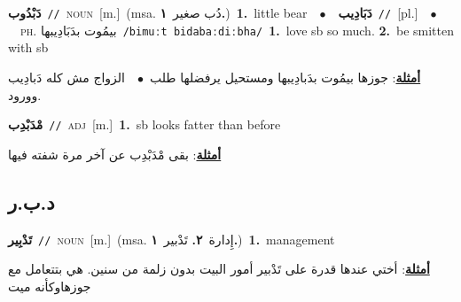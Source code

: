 \documentclass[10pt,a4paper,twoside]{article} %
\begin{document}
\begin{multicols}{2}
{{\setlength\topsep{0pt}\textbf{\foreignlanguage{arabic}{دَبْدُوب}}\ {\color{gray}\texttt{//}\color{black}}\ \textsc{noun}\ [m.]\ \color{gray}(msa. \foreignlanguage{arabic}{دُب صغير}~\foreignlanguage{arabic}{\textbf{١.}})\color{black}\ \textbf{1.}~little bear\ \ $\bullet$\ \ \setlength\topsep{0pt}\textbf{\foreignlanguage{arabic}{دَبَادِيب}}\ {\color{gray}\texttt{//}\color{black}}\ [pl.]\ \ $\bullet$\ \ \textsc{ph.} \color{gray} \foreignlanguage{arabic}{بيمُوت بدَبَادِيبها}\color{black}\ {\color{gray}\texttt{/{\sffamily bimuːt bidabaːdiːbha}/}\color{black}}\ \textbf{1.}~love sb so much.  \textbf{2.}~be smitten with sb\  \begin{flushright}\color{gray}\foreignlanguage{arabic}{\textbf{\underline{\foreignlanguage{arabic}{أمثلة}}}: جوزها بيمُوت بدَبادِيبها ومستحيل يرفضلها طلب\ $\bullet$\ \  الزواج مش كله دَبادِيب وورود.}\end{flushright}\color{black}} \vspace{2mm}

{\setlength\topsep{0pt}\textbf{\foreignlanguage{arabic}{مْدَبْدِب}}\ {\color{gray}\texttt{//}\color{black}}\ \textsc{adj}\ [m.]\ \textbf{1.}~sb looks fatter than before\  \begin{flushright}\color{gray}\foreignlanguage{arabic}{\textbf{\underline{\foreignlanguage{arabic}{أمثلة}}}: بقى مْدَبْدِب عن آخر مرة شفته فيها}\end{flushright}\color{black}} \vspace{2mm}

\vspace{-3mm}
\subsection*{\color{blue}\foreignlanguage{arabic}{د.ب.ر}\color{blue}{}} 

{\setlength\topsep{0pt}\textbf{\foreignlanguage{arabic}{تَدْبِير}}\ {\color{gray}\texttt{//}\color{black}}\ \textsc{noun}\ [m.]\ \color{gray}(msa. \foreignlanguage{arabic}{إِدارة}~\foreignlanguage{arabic}{\textbf{٢.}}  \foreignlanguage{arabic}{تَدْبير}~\foreignlanguage{arabic}{\textbf{١.}})\color{black}\ \textbf{1.}~management\  \begin{flushright}\color{gray}\foreignlanguage{arabic}{\textbf{\underline{\foreignlanguage{arabic}{أمثلة}}}: أختي عندها قدرة على تَدْبير أمور البيت بدون زلمة من سنين. هي بتتعامل مع جوزهاوكأنه ميت}\end{flushright}\color{black}} \vspace{2mm}

}
\end{multicols}
\end{document}
